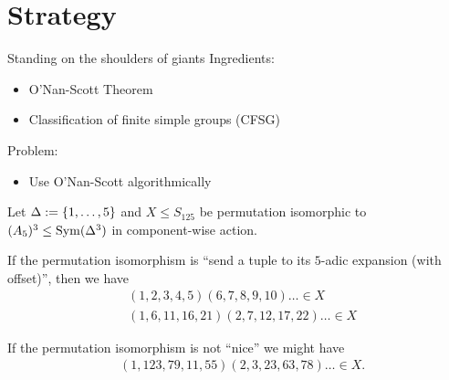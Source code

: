 \documentclass{beamer}
\theoremstyle{plain}
\theoremstyle{definition}
\begin{document}
%


\section{Strategy}
\begin{frame}{Standing on the shoulders of giants}
Ingredients:
\begin{itemize}
\item O'Nan-Scott Theorem
\item Classification of finite simple groups (CFSG)
\end{itemize}

\pause
Problem:
\begin{itemize}
\item Use O'Nan-Scott algorithmically
\end{itemize}

\end{frame}


\begin{frame}
Let $\Delta :=  \left\{ 1, \ldots, 5 \right\} $ and
$X \leq S_{125}$ be permutation isomorphic to
$(A_5) ^ 3 \leq \operatorname{Sym}(\Delta ^ 3)$ in component-wise action.

If the permutation isomorphism is ``send a tuple to its $5$-adic expansion
(with offset)'',
\pause
then we have
\begin{align*}
    &(1, 2, 3, 4, 5) (6, 7, 8, 9, 10) \ldots \in X
    \\
    &(1, 6, 11, 16, 21) (2, 7, 12, 17, 22) \ldots \in X
\end{align*}

\pause
If the permutation isomorphism is not ``nice'' we might have
\begin{align*}
    &(1, 123, 79, 11, 55) (2, 3, 23, 63, 78) \ldots \in X.
\end{align*}
\end{frame}
\end{document}
